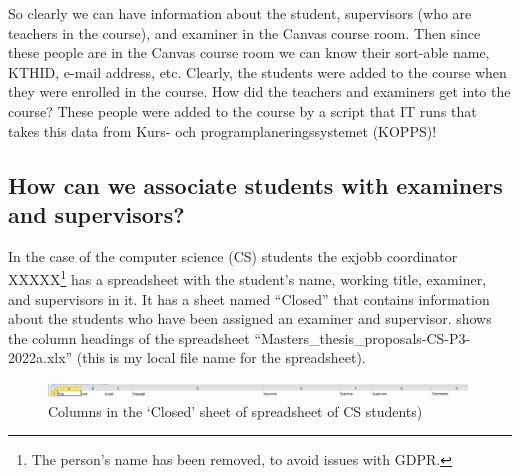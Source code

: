 So clearly we can have information about the student, supervisors (who are teachers in the course), and examiner in the Canvas course room. Then since these people are in the Canvas course room we can know their sort-able name, KTHID, e-mail address, etc. Clearly, the students were added to the course when they were enrolled in the course. How did the teachers and examiners get into the course? These people were added to the course by a script that IT runs that takes this data from Kurs- och programplaneringssystemet (KOPPS)!

\subsection{How can we associate students with examiners and supervisors?}
In the case of the computer science (CS) students the exjobb coordinator XXXXX\footnote{The person's name has been removed, to avoid issues with GDPR.} has a spreadsheet with the student’s name, working title, examiner, and supervisors in it. It has a sheet named “Closed” that contains information about the students who have been assigned an examiner and supervisor.  shows the column headings of the spreadsheet “Masters\_thesis\_proposals-CS-P3-2022a.xlx” (this is my local file name for the spreadsheet).
	
\begin{figure}[!ht]
  \begin{center}
    \includegraphics[width=0.99\textwidth]{README_notes/README-examiner-figures/sheet-columns-Screenshot_20220325_155622.png}
  \end{center}
  \caption{Columns in the `Closed' sheet of spreadsheet of CS students)}
  \label{fig:spreadsheetOfCSStudents}
\end{figure}


